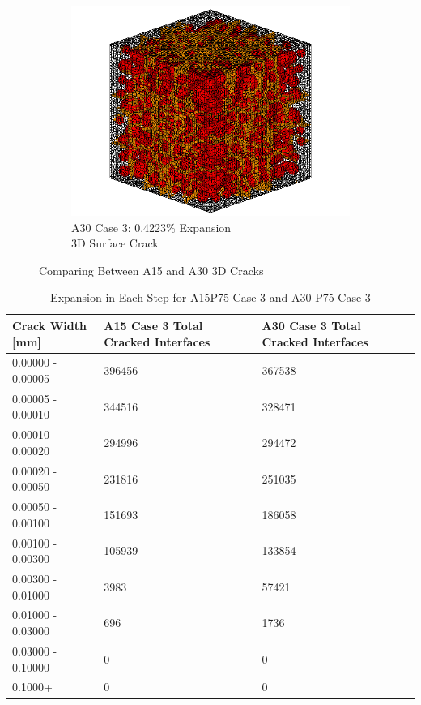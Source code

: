 \begin{figure}[ht!]
\begin{subfigure}{.5\textwidth}
      \includegraphics[width=.8\linewidth]{Files/exp_3D/DEF/A30X0C_3_c.png}
    \caption{A30 Case 3: 0.4223\% Expansion\\ 3D Surface Crack}
    \end{subfigure}


  \caption{Comparing Between A15 and A30 3D Cracks}
  \label{fig:DEF_A15vsA30X0C_3D}
\end{figure}

\begin{table}[!h]
  \caption{Expansion in Each Step for A15P75 Case 3 and A30 P75 Case 3}
\centering
\begin{tabular}{ ||p{4cm}|p{4cm}|p{4cm}|| }
\hline
 Crack Width [mm] &  A15 Case 3 Total Cracked Interfaces &  A30 Case 3 Total Cracked Interfaces \\
 \hline\hline

   0.00000 - 0.00005 & 396456 & 367538 \\
   0.00005 - 0.00010 & 344516 & 328471 \\
   0.00010 - 0.00020 & 294996 & 294472 \\
   0.00020 - 0.00050 & 231816 & 251035 \\
   0.00050 - 0.00100 & 151693 & 186058 \\
   0.00100 - 0.00300 & 105939 & 133854 \\
   0.00300 - 0.01000 &  3983 &  57421\\
   0.01000 - 0.03000 & 696 & 1736 \\
   0.03000 - 0.10000 & 0 & 0 \\
   0.1000+ & 0 & 0 \\

  \hline
  \end{tabular}

\label{table:A15vsA30P75_3_Cracks}
\end{table}


